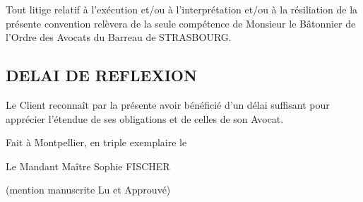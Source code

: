 \documentclass[
  11pt,
]{letter}
\begin{document}
\begin{letter}{}
Tout litige relatif à l'exécution et/ou à l'interprétation et/ou à la
résiliation de la présente convention relèvera de la seule compétence de
Monsieur le Bâtonnier de l'Ordre des Avocats du Barreau de STRASBOURG.

\hypertarget{delai-de-reflexion}{%
\subsection{DELAI DE REFLEXION}\label{delai-de-reflexion}}

Le Client reconnaît par la présente avoir bénéficié d'un délai suffisant
pour apprécier l'étendue de ses obligations et de celles de son Avocat.

Fait à Montpellier, en triple exemplaire le

Le Mandant Maître Sophie FISCHER

(mention manuscrite Lu et Approuvé)



\vfill
\end{letter}
\end{document}
